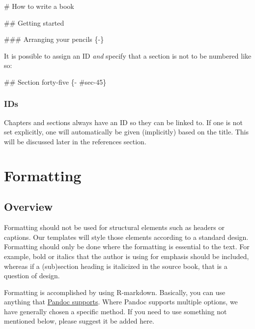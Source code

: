 \documentclass[
]{book}
\newenvironment{Shaded}{\begin{snugshade}}{\end{snugshade}}
\newcommand{\FunctionTok}[1]{\textcolor[rgb]{0.00,0.00,0.00}{#1}}
\begin{document}
\begin{Shaded}
\begin{Highlighting}[]
\FunctionTok{\# How to write a book}

\FunctionTok{\#\# Getting started}

\FunctionTok{\#\#\# Arranging your pencils \{{-}\}}
\end{Highlighting}
\end{Shaded}

It is possible to assign an ID \emph{and} specify that a section is not to be numbered like so:

\begin{Shaded}
\begin{Highlighting}[]
\FunctionTok{\#\# Section forty{-}five \{{-} \#sec{-}45\}}
\end{Highlighting}
\end{Shaded}

\hypertarget{ids}{%
\subsection{IDs}\label{ids}}

Chapters and sections always have an ID so they can be linked to. If one is not set explicitly, one will automatically be given (implicitly) based on the title. This will be discussed later in the references section.

\hypertarget{formatting}{%
\chapter{Formatting}\label{formatting}}

\hypertarget{overview}{%
\section{Overview}\label{overview}}

Formatting should not be used for structural elements such as headers or captions. Our templates will style those elements according to a standard design. Formatting should only be done where the formatting is essential to the text. For example, bold or italics that the author is using for emphasis should be included, whereas if a (sub)section heading is italicized in the source book, that is a question of design.

Formatting is accomplished by using R-markdown. Basically, you can use anything that \href{https://pandoc.org/MANUAL.html\#pandocs-markdown}{Pandoc supports}. Where Pandoc supports multiple options, we have generally chosen a specific method. If you need to use something not mentioned below, please suggest it be added here.
\end{document}
